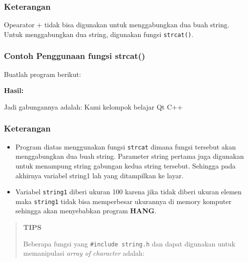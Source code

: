 {{\begin{figure}[htbp]
\centering
{}

\end{figure}

\subsubsection*{Keterangan}

Opearator + tidak bisa digunakan untuk menggabungkan dua buah string.
Untuk menggabungkan dua string, digunakan fungsi \texttt{strcat()}.

\subsubsection*{Contoh Penggunaan fungsi strcat()}

Buatlah program berikut:



\textbf{Hasil:}

\begin{lcverbatim}
Jadi gabungannya adalah:
Kami kelompok belajar Qt C++
\end{lcverbatim}


\subsubsection*{Keterangan}

\begin{itemize}

\item
 Program diatas menggunakan fungsi \texttt{strcat} dimana fungsi
 tersebut akan menggabungkan dua buah string. Parameter string pertama
 juga digunakan untuk menampung string gabungan kedua string tersebut.
 Sehingga pada akhirnya variabel string1 lah yang ditampilkan ke layar.
\item
 Variabel \texttt{string1} diberi ukuran 100 karena jika tidak diberi
 ukuran elemen maka \texttt{string1} tidak bisa memperbesar ukurannya
 di memory komputer sehingga akan menyebabkan program \textbf{HANG}.
\end{itemize}

\begin{quotation}
{\LARGE {}} \textbf{TIPS}

Beberapa fungsi yang \texttt{\#include\ string.h} dan dapat digunakan
untuk memanipulasi \emph{array of character} adalah:


\end{quotation}}}
